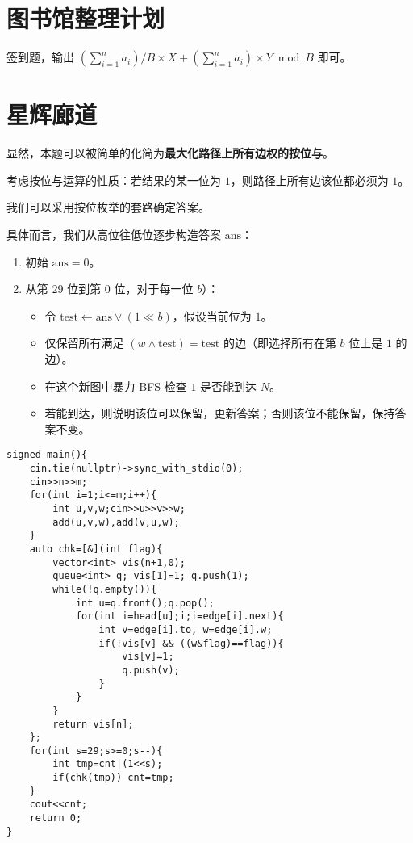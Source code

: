 \documentclass[14pt,a4paper]{article}
\begin{document}
\section{图书馆整理计划}
签到题，输出 $\left(\sum_{i=1}^{n} a_i\right)/B\times X + \left(\sum_{i=1}^{n} a_i\right) \times Y \bmod B $ 即可。


\section{星辉廊道}
显然，本题可以被简单的化简为\textbf{最大化路径上所有边权的按位与}。

\begin{hintbox}
考虑按位与运算的性质：若结果的某一位为 $1$，则路径上所有边该位都必须为 $1$。
\end{hintbox}

我们可以采用按位枚举的套路确定答案。

具体而言，我们从高位往低位逐步构造答案 $\text{ans}$：

\begin{enumerate}
  \item 初始 $\text{ans}=0$。
  \item 从第 $29$ 位到第 $0$ 位，对于每一位 $b$）：
  \begin{itemize}
  \item 令 $\text{test} \leftarrow \text{ans} \lor (1 \ll b)$，假设当前位为 $1$。
  \item 仅保留所有满足 $(w \land \text{test}) = \text{test}$ 的边（即选择所有在第 $b$ 位上是 $1$ 的边）。
  \item 在这个新图中暴力 BFS 检查 $1$ 是否能到达 $N$。
  \item 若能到达，则说明该位可以保留，更新答案；否则该位不能保留，保持答案不变。
  \end{itemize}
\end{enumerate}

\begin{verbatim}
signed main(){
    cin.tie(nullptr)->sync_with_stdio(0);
    cin>>n>>m;
    for(int i=1;i<=m;i++){
        int u,v,w;cin>>u>>v>>w;
        add(u,v,w),add(v,u,w);
    }
    auto chk=[&](int flag){
        vector<int> vis(n+1,0);
        queue<int> q; vis[1]=1; q.push(1);
        while(!q.empty()){
            int u=q.front();q.pop();
            for(int i=head[u];i;i=edge[i].next){
                int v=edge[i].to, w=edge[i].w;
                if(!vis[v] && ((w&flag)==flag)){
                    vis[v]=1;
                    q.push(v);
                }
            }
        }
        return vis[n];
    };
    for(int s=29;s>=0;s--){
        int tmp=cnt|(1<<s);
        if(chk(tmp)) cnt=tmp;
    }
    cout<<cnt;
    return 0;
}
\end{verbatim}
\end{document}
